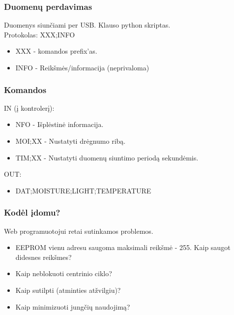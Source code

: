 \documentclass[12pt,a4paper]{beamer}
\begin{document}
\begin{frame}
    \frametitle{Duomenų perdavimas}

    Duomenys siunčiami per USB. Klauso python skriptas.\\
    \vskip1cm
    Protokolas: XXX;INFO

    \begin{itemize}
        \item XXX - komandos prefix'as.
        \item INFO - Reikšmės/informacija (neprivaloma)
    \end{itemize}
\end{frame}

\begin{frame}
    \frametitle{Komandos}
    
    IN (į kontrolerį):
    \begin{itemize}
        \item NFO - Išplėstinė informacija.
        \item MOI;XX - Nustatyti drėgnumo ribą.
        \item TIM;XX - Nustatyti duomenų siuntimo periodą sekundėmis.
    \end{itemize}

    OUT:
    \begin{itemize}
        \item DAT;MOISTURE;LIGHT;TEMPERATURE
    \end{itemize}

\end{frame}

\begin{frame}
    \frametitle{Kodėl įdomu?}
    Web programuotojui retai sutinkamos problemos.
    \vskip1cm
    \begin{itemize}
        \item EEPROM vienu adresu saugoma maksimali reikšmė - 255. Kaip saugot didesnes reikšmes?
        \item Kaip neblokuoti centrinio ciklo? 
        \item Kaip sutilpti (atminties atžvilgiu)?
        \item Kaip minimizuoti jungčių naudojimą?
    \end{itemize}
    
\end{frame}
\end{document}
